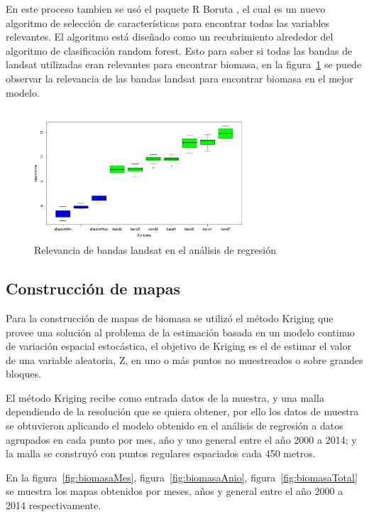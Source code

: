 En este proceso tambien se usó el paquete R Boruta \cite{kursa2010feature}, el cual es un nuevo algoritmo de selección de características 
para encontrar todas las variables relevantes. El algoritmo está diseñado como un recubrimiento alrededor 
del algoritmo de clasificación random forest. Esto para saber si todas las bandas de landsat utilizadas eran relevantes para encontrar biomasa, 
en la figura~\ref{fig:boruta} se puede observar la relevancia de las bandas landsat para encontrar biomasa en el mejor modelo.

\begin{figure}
  \centering
  \includegraphics[width = 8cm]{boruta.pdf}
  \caption{Relevancia de bandas landsat en el análisis de regresión}
  \label{fig:boruta}
\end{figure}

\subsection{Construcción de mapas}

Para la construcción de mapas de biomasa se utilizó el método Kriging que provee una solución al problema 
de la estimación basada en un modelo continuo de variación espacial estocástica, el objetivo de Kriging es el de estimar el valor de una 
variable aleatoria, Z, en uno o más puntos no muestreados o sobre grandes bloques. 

El método Kriging recibe como entrada datos de la muestra, y una malla dependiendo de la resolución que se quiera obtener, por ello los datos de muestra se
obtuvieron aplicando el modelo obtenido en el análisis de regresión a datos agrupados en cada punto por mes, año y uno general entre el año 2000 a 2014; y la 
 malla se construyó con puntos regulares espaciados cada 450 metros. 
 
 En la figura~\ref{fig:biomasaMes}, figura~\ref{fig:biomasaAnio}, figura~\ref{fig:biomasaTotal}  se muestra los mapas obtenidos por meses, años y general entre el año 2000 a 2014 respectivamente. 
 
